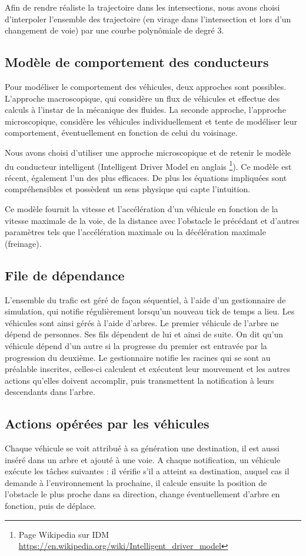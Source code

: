 \documentclass[11pt]{article}
\begin{document}
Afin de rendre réaliste la trajectoire dans les intersections, nous avons choisi d'interpoler l'ensemble des trajectoire (en virage dans l'intersection et lors d'un changement de voie) par une courbe polynômiale de degré 3.

\subsection{Modèle de comportement des conducteurs}
Pour modéliser le comportement des véhicules, deux approches sont possibles. L'approche macroscopique, qui considère un flux de véhicules et effectue des calculs à l'instar de la mécanique des fluides. La seconde approche, l'approche microscopique, considère les véhicules individuellement et tente de modéliser leur comportement, éventuellement en fonction de celui du voisinage. 

Nous avons choisi d'utiliser une approche microscopique et de retenir le modèle du conducteur intelligent (Intelligent Driver Model en anglais \footnote{Page Wikipedia sur IDM \url{https://en.wikipedia.org/wiki/Intelligent_driver_model}}). Ce modèle est récent, également l'un des plus efficaces. De plus les équations impliquées sont compréhensibles et possèdent un sens physique qui capte l'intuition.

Ce modèle fournit la vitesse et l'accélération d'un véhicule en fonction de la vitesse maximale de la voie, de la distance avec l'obstacle le précédant et d'autres paramètres tels que l'accélération maximale ou la décélération maximale (freinage).

\subsection{File de dépendance}
L'ensemble du trafic est géré de façon séquentiel, à l'aide d'un gestionnaire de simulation, qui notifie régulièrement lorsqu'un nouveau \og tick \fg de temps a lieu. Les véhicules sont ainsi gérés à l'aide d'arbres. Le premier véhicule de l'arbre ne dépend de personnes. Ses fils dépendent de lui et ainsi de suite. On dit qu'un véhicule dépend d'un autre si la progresse du premier est entravée par la progression du deuxième. Le gestionnaire notifie les racines qui se sont au préalable inscrites, celles-ci calculent et exécutent leur mouvement et les autres actions qu'elles doivent accomplir, puis transmettent la notification à leurs descendants dans l'arbre. 

\subsection{Actions opérées par les véhicules}
Chaque véhicule se voit attribué à sa génération une destination, il est aussi inséré dans un arbre et ajouté à une voie. A chaque notification, un véhicule exécute les tâches suivantes : il vérifie s'il a atteint sa destination, auquel cas il demande à l'environnement la prochaine, il calcule ensuite la position de l'obstacle le plus proche dans sa direction, change éventuellement d'arbre en fonction, puis de déplace. 
\end{document}
